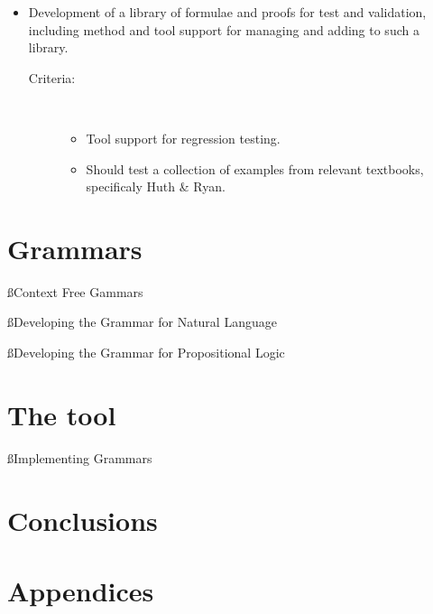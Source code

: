 \documentclass[a4paper]{article}
\begin{document}
\begin{itemize}
\item
    Development of a library of formulae and proofs for test and validation,
    including method and tool support for managing and adding to such a 
    library.
    \begin{description}
        \item[Criteria:]~ \\ \vspace{-5 mm}
            \begin{itemize}
                \item Tool support for regression testing.
                \item Should test a collection of examples from relevant
                textbooks, specificaly Huth \& Ryan\cite{hr}.
            \end{itemize}
    \end{description}
\end{itemize}

\section{Grammars}
\ss{Context Free Gammars}

\ss{Developing the Grammar for Natural Language}


\ss{Developing the Grammar for Propositional Logic}

\section{The tool}
\ss{Implementing Grammars}

\section{Conclusions}


\label{LastBody}
\pagebreak
{}


\label{LastBio}
\pagebreak
\appendix
{}
\section*{Appendices}
\end{document}
